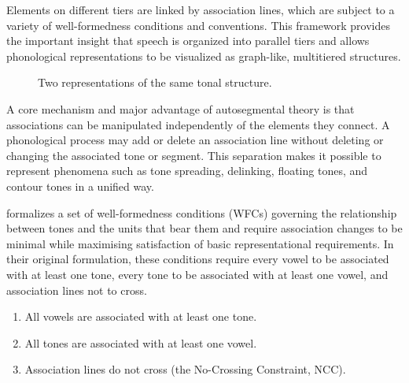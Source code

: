 Elements on different tiers are linked by association lines, which are 
subject to a variety of well-formedness conditions and conventions. 
This framework provides the important insight that speech is
organized into parallel tiers and allows phonological representations to be
visualized as graph-like, multitiered structures. 
\begin{figure}[ht]
\centering
{}
\caption{Two representations of the same tonal structure.}
\label{fig:autosegmental-representations}
\end{figure}

A core mechanism and major advantage of autosegmental theory is that
associations can be manipulated independently of the elements they connect.
A phonological process may add or delete an association line without deleting
or changing the associated tone or segment. This separation makes it possible
to represent phenomena such as tone spreading, delinking, floating tones,
and contour tones in a unified way.


\citet{goldsmith1976autosegmental} formalizes a set of well-formedness
conditions (WFCs) governing the relationship between tones and the units
that bear them and require association changes to be minimal while 
maximising satisfaction of basic representational requirements.
In their original formulation, these conditions require
every vowel to be associated with at least one tone, every tone to be
associated with at least one vowel, and association lines not to cross.
\begin{enumerate}
    \setlength{\itemsep}{0em}
    \setlength{\parskip}{0em}
    \item All vowels are associated with at least one tone.
    \item All tones are associated with at least one vowel.
    \item Association lines do not cross (the No-Crossing Constraint, NCC).
\end{enumerate}

